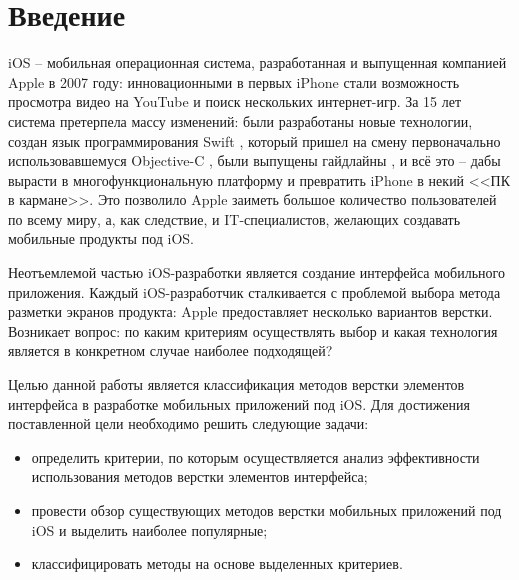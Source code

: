 \chapter*{Введение}

iOS \cite{ios} -- мобильная операционная система, разработанная и выпущенная компанией Apple \cite{apple} в 2007 году: инновационными в первых iPhone \cite{iphone} стали возможность просмотра видео на YouTube \cite{youtube} и поиск нескольких интернет-игр. За 15 лет система претерпела массу изменений: были разработаны новые технологии, создан язык программирования Swift \cite{swift}, который пришел на смену первоначально использовавшемуся Objective-C \cite{objc}, были выпущены гайдлайны \cite{hig}, и всё это -- дабы вырасти в многофункциональную платформу и превратить iPhone в некий <<ПК в кармане>>. Это позволило Apple заиметь большое количество пользователей по всему миру, а, как следствие, и IT-специалистов, желающих создавать мобильные продукты под iOS. 

Неотъемлемой частью iOS-разработки является создание интерфейса мобильного приложения. Каждый iOS-разработчик сталкивается с проблемой выбора метода разметки экранов продукта: Apple предоставляет несколько вариантов верстки. Возникает вопрос: по каким критериям осуществлять выбор и какая технология является в конкретном случае наиболее подходящей?

Целью данной работы является классификация методов верстки элементов интерфейса в разработке мобильных приложений под iOS. Для достижения поставленной цели необходимо решить следующие задачи: 

\begin{itemize}
	\item определить критерии, по которым осуществляется анализ эффективности использования методов верстки элементов интерфейса;
	\item провести обзор существующих методов верстки мобильных приложений под iOS и выделить наиболее популярные;
	\item классифицировать методы на основе выделенных критериев.
\end{itemize}
